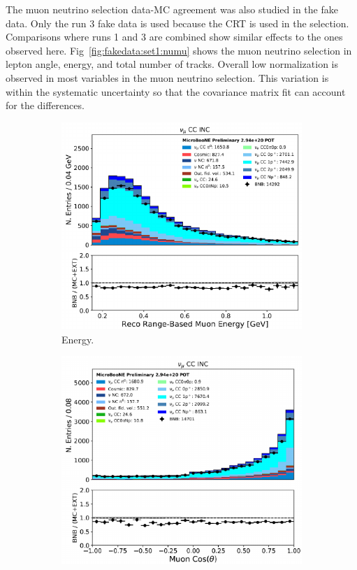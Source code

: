 The muon neutrino selection data-MC agreement was also studied in the fake data.  Only the run 3 fake data is used because the CRT is used in the selection. Comparisons where runs 1 and 3 are combined show similar effects to the ones observed here. 
Fig~\ref{fig:fakedata:set1:numu} shows the muon neutrino selection in lepton angle, energy, and total number of tracks. Overall low normalization is observed in most variables in the muon neutrino selection.  This variation is within the systematic uncertainty so that the covariance matrix fit can account for the differences.

\begin{figure}[H] 
\begin{center}
    \begin{subfigure}[b]{0.3\textwidth}
    \centering
    \includegraphics[width=1.00\textwidth]{Fakedata/set1/numu_energy.pdf}
    \caption{\label{fig:fakedata:set1:numu_energy} Energy.}
    \end{subfigure}
    \begin{subfigure}[b]{0.3\textwidth}
    \centering
    \includegraphics[width=1.00\textwidth]{Fakedata/set1/numu_costheta.pdf}

\end{subfigure}
\end{center}
\end{figure}
